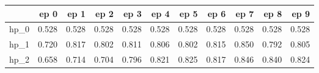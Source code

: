 \begin{tabular}{lrrrrrrrrrr}
\toprule
{} &   ep 0 &   ep 1 &   ep 2 &   ep 3 &   ep 4 &   ep 5 &   ep 6 &   ep 7 &   ep 8 &   ep 9 \\
\midrule
hp\_0 &  0.528 &  0.528 &  0.528 &  0.528 &  0.528 &  0.528 &  0.528 &  0.528 &  0.528 &  0.528 \\
hp\_1 &  0.720 &  0.817 &  0.802 &  0.811 &  0.806 &  0.802 &  0.815 &  0.850 &  0.792 &  0.805 \\
hp\_2 &  0.658 &  0.714 &  0.704 &  0.796 &  0.821 &  0.825 &  0.817 &  0.846 &  0.840 &  0.824 \\
\bottomrule
\end{tabular}
